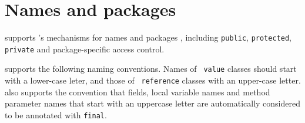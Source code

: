 \chapter{Names and packages}
\label{packages} 

\Xten{} supports \java's mechanisms for names and packages \cite[\S
6,\S 7]{jls2}, including {\tt public}, {\tt protected}, {\tt private}
and package-specific access control. 


\Xten{} supports the following naming conventions. Names of {\tt
value} classes should start with a lower-case leter, and those of {\tt
reference} classes with an upper-case letter. \Xten{} also 
supports the convention that fields, local variable names
and method parameter names that start with an uppercase letter are
automatically considered to be annotated with {\tt final}.
\label{LexicalConventionForFinals}



